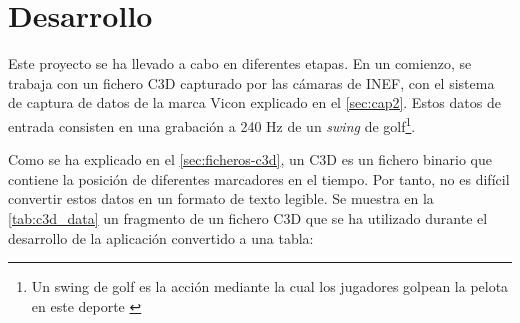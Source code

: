 


\chapter{Desarrollo} \label{sec:cap3}

\noindent Este proyecto se ha llevado a cabo en diferentes etapas. En un comienzo, se trabaja con un fichero \ac{C3D} capturado por las cámaras de INEF, con el sistema de captura de datos de la marca Vicon explicado en el \autoref{sec:cap2}. Estos datos de entrada consisten en una grabación a 240 \ac{Hz} de un \textit{swing} de golf\footnote{Un swing de golf es la acción mediante la cual los jugadores golpean la pelota en este deporte \autocite{GolfSwing2025}}. 

Como se ha explicado en el \autoref{sec:ficheros-c3d}, un \ac{C3D} es un fichero binario que contiene la posición de diferentes marcadores en el tiempo. Por tanto, no es difícil convertir estos datos en un formato de texto legible. Se muestra en la \autoref{tab:c3d_data} un fragmento de un fichero \ac{C3D} que se ha utilizado durante el desarrollo de la aplicación convertido a una tabla:

